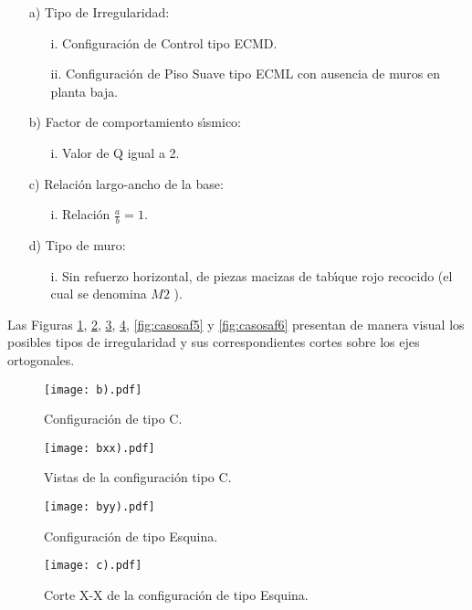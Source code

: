 \begin{itemize}
	\item [a)] Tipo de Irregularidad: 
	\begin{itemize}
		\item [i.] Configuraci\'on de Control tipo ECMD.
				\item [ii.] Configuraci\'on de 	Piso Suave tipo ECML con ausencia de muros en planta baja.
	\end{itemize}
	\item [b)] Factor de comportamiento s\'{\i}smico: 
	\begin{itemize}
		\item [i.] Valor de Q igual a 2.
	\end{itemize}
	\item [c)] Relaci\'on largo-ancho de la base: 
	\begin{itemize}
		\item [i.] Relaci\'on $\frac{a}{b}=1$.
	\end{itemize}
	\item [d)] Tipo de muro: 
	\begin{itemize}
		\item [i.] Sin refuerzo horizontal, de piezas macizas de tab\'{\i}que rojo recocido (el cual se denomina $M2$ \cite{AA2001}).
	\end{itemize}
\end{itemize}

Las Figuras \ref{fig:casosaf1}, \ref{fig:casosaf2}, \ref{fig:casosaf3}, \ref{fig:casosaf4}, \ref{fig:casosaf5} y \ref{fig:casosaf6} presentan de manera visual los posibles tipos de irregularidad y sus correspondientes cortes sobre los ejes ortogonales.  

\begin{figure} [htbp]
\centering
\texttt{[image: b).pdf]}
\caption{Configuraci\'on de tipo C.}
\label{fig:casosaf1}
\end{figure}

\begin{figure} [htbp]
\centering
\texttt{[image: bxx).pdf]}
\caption{Vistas de la configuraci\'on tipo C.}
\label{fig:casosaf2}
\end{figure}

\begin{figure} [htbp]
\centering
\texttt{[image: byy).pdf]}
\caption{Configuraci\'on de tipo Esquina.}
\label{fig:casosaf3}
\end{figure}

\begin{figure} [htbp]
\centering
\texttt{[image: c).pdf]}
\caption{Corte X-X de la configuraci\'on de tipo Esquina.}
\label{fig:casosaf4}
\end{figure}

